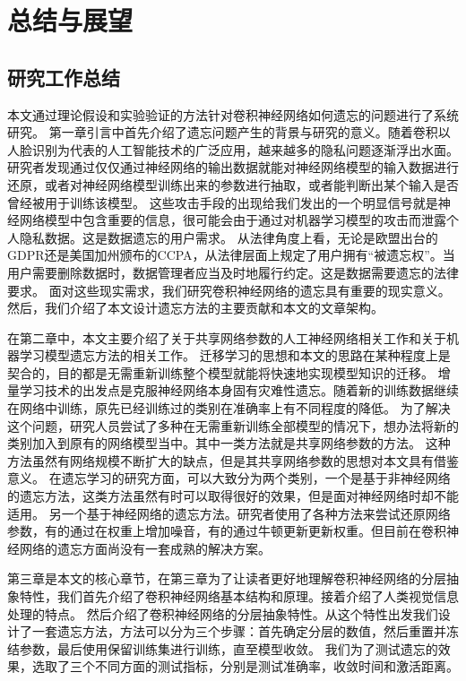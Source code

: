 
\chapter{总结与展望}

\section{研究工作总结}

本文通过理论假设和实验验证的方法针对卷积神经网络如何遗忘的问题进行了系统研究。
第一章引言中首先介绍了遗忘问题产生的背景与研究的意义。随着卷积以人脸识别为代表的人工智能技术的广泛应用，越来越多的隐私问题逐渐浮出水面。
研究者发现通过仅仅通过神经网络的输出数据就能对神经网络模型的输入数据进行还原，或者对神经网络模型训练出来的参数进行抽取，或者能判断出某个输入是否曾经被用于训练该模型。
这些攻击手段的出现给我们发出的一个明显信号就是神经网络模型中包含重要的信息，很可能会由于通过对机器学习模型的攻击而泄露个人隐私数据。这是数据遗忘的用户需求。
从法律角度上看，无论是欧盟出台的GDPR还是美国加州颁布的CCPA，从法律层面上规定了用户拥有“被遗忘权”。当用户需要删除数据时，数据管理者应当及时地履行约定。这是数据需要遗忘的法律要求。
面对这些现实需求，我们研究卷积神经网络的遗忘具有重要的现实意义。
然后，我们介绍了本文设计遗忘方法的主要贡献和本文的文章架构。

在第二章中，本文主要介绍了关于共享网络参数的人工神经网络相关工作和关于机器学习模型遗忘方法的相关工作。
迁移学习的思想和本文的思路在某种程度上是契合的，目的都是无需重新训练整个模型就能将快速地实现模型知识的迁移。
增量学习技术的出发点是克服神经网络本身固有灾难性遗忘。随着新的训练数据继续在网络中训练，原先已经训练过的类别在准确率上有不同程度的降低。
为了解决这个问题，研究人员尝试了多种在无需重新训练全部模型的情况下，想办法将新的类别加入到原有的网络模型当中。其中一类方法就是共享网络参数的方法。
这种方法虽然有网络规模不断扩大的缺点，但是其共享网络参数的思想对本文具有借鉴意义。
在遗忘学习的研究方面，可以大致分为两个类别，一个是基于非神经网络的遗忘方法，这类方法虽然有时可以取得很好的效果，但是面对神经网络时却不能适用。
另一个基于神经网络的遗忘方法。研究者使用了各种方法来尝试还原网络参数，有的通过在权重上增加噪音，有的通过牛顿更新更新权重。但目前在卷积神经网络的遗忘方面尚没有一套成熟的解决方案。

第三章是本文的核心章节，在第三章为了让读者更好地理解卷积神经网络的分层抽象特性，我们首先介绍了卷积神经网络基本结构和原理。接着介绍了人类视觉信息处理的特点。
然后介绍了卷积神经网络的分层抽象特性。从这个特性出发我们设计了一套遗忘方法，方法可以分为三个步骤：首先确定分层的数值，然后重置并冻结参数，最后使用保留训练集进行训练，直至模型收敛。
我们为了测试遗忘的效果，选取了三个不同方面的测试指标，分别是测试准确率，收敛时间和激活距离。

